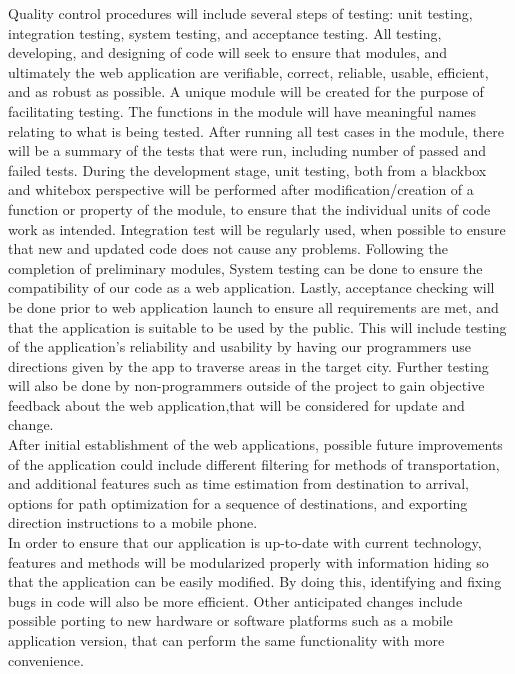 \documentclass[12pt]{article}
\begin{document}
Quality control procedures will include several steps of testing: unit testing, integration testing, system testing, and acceptance testing. All testing, developing, and designing of code will seek to ensure that modules, and ultimately the web application are verifiable, correct, reliable, usable, efficient, and as robust as possible. A unique module will be created for the purpose of facilitating testing. The functions in the module will have meaningful names relating to what is being tested. After running all test cases in the module, there will be a summary of the tests that were run, including number of passed and failed tests. During the development stage, unit testing, both from a blackbox and whitebox perspective will be performed after modification/creation of a function or property of the module, to ensure that the individual units of code work as intended. Integration test will be regularly used, when possible to ensure that new and updated code does not cause any problems. Following the completion of preliminary modules, System testing can be done to ensure the compatibility of our code as a web application. Lastly, acceptance checking will be done prior to web application launch to ensure all requirements are met, and that the application is suitable to be used by the public. This will include testing of the application’s reliability and usability by having our programmers use directions given by the app to traverse areas in the target city. Further testing will also be done by non-programmers outside of the project to gain objective feedback about the web application,that will be considered for update and change. \\

After initial establishment of the web applications, possible future improvements of the application could include different filtering for methods of transportation, and additional features such as time estimation from destination to arrival, options for path optimization for a sequence of destinations, and exporting direction instructions to a mobile phone.\\

In order to ensure that our application is up-to-date with current technology, features and methods will be modularized properly with information hiding so that the application can be easily modified. By doing this, identifying and fixing bugs in code will also be more efficient. Other anticipated changes include possible porting to new hardware or software platforms such as a mobile application version, that can perform the same functionality with more convenience. \\
\end{document}
